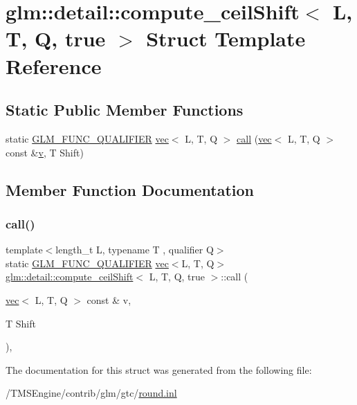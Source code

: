 \hypertarget{structglm_1_1detail_1_1compute__ceil_shift_3_01_l_00_01_t_00_01_q_00_01true_01_4}{}\section{glm\+:\+:detail\+:\+:compute\+\_\+ceil\+Shift$<$ L, T, Q, true $>$ Struct Template Reference}
\label{structglm_1_1detail_1_1compute__ceil_shift_3_01_l_00_01_t_00_01_q_00_01true_01_4}
\subsection*{Static Public Member Functions}
\begin{DoxyCompactItemize}
\item 
static \hyperlink{setup_8hpp_a33fdea6f91c5f834105f7415e2a64407}{G\+L\+M\+\_\+\+F\+U\+N\+C\+\_\+\+Q\+U\+A\+L\+I\+F\+I\+ER} \hyperlink{structglm_1_1vec}{vec}$<$ L, T, Q $>$ \hyperlink{structglm_1_1detail_1_1compute__ceil_shift_3_01_l_00_01_t_00_01_q_00_01true_01_4_a0e2262617f657d648f33fb98d6eca5c7}{call} (\hyperlink{structglm_1_1vec}{vec}$<$ L, T, Q $>$ const \&\hyperlink{_s_d_l__opengl_8h_a10a82eabcb59d2fcd74acee063775f90}{v}, T Shift)
\end{DoxyCompactItemize}


\subsection{Member Function Documentation}
\mbox{\label{structglm_1_1detail_1_1compute__ceil_shift_3_01_l_00_01_t_00_01_q_00_01true_01_4_a0e2262617f657d648f33fb98d6eca5c7}} 
\subsubsection{\texorpdfstring{call()}{call()}}
{\footnotesize\ttfamily template$<$length\+\_\+t L, typename T , qualifier Q$>$ \\
static \hyperlink{setup_8hpp_a33fdea6f91c5f834105f7415e2a64407}{G\+L\+M\+\_\+\+F\+U\+N\+C\+\_\+\+Q\+U\+A\+L\+I\+F\+I\+ER} \hyperlink{structglm_1_1vec}{vec}$<$L, T, Q$>$ \hyperlink{structglm_1_1detail_1_1compute__ceil_shift}{glm\+::detail\+::compute\+\_\+ceil\+Shift}$<$ L, T, Q, true $>$\+::call (\begin{DoxyParamCaption}\item[{\hyperlink{structglm_1_1vec}{vec}$<$ L, T, Q $>$ const \&}]{v,  }\item[{T}]{Shift }\end{DoxyParamCaption})\hspace{0.3cm}{\ttfamily [inline]}, {\ttfamily [static]}}



The documentation for this struct was generated from the following file\+:\begin{DoxyCompactItemize}
\item 
/\+T\+M\+S\+Engine/contrib/glm/gtc/\hyperlink{round_8inl}{round.\+inl}\end{DoxyCompactItemize}
